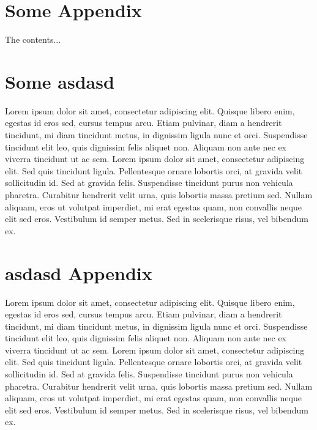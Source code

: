 \appendixpage
\begin{appendices}

\chapter{Some Appendix}
	The contents...

\chapter{Some asdasd}
	Lorem ipsum dolor sit amet, consectetur adipiscing elit. Quisque libero enim, egestas id eros sed, cursus tempus arcu. Etiam pulvinar, diam a hendrerit tincidunt, mi diam tincidunt metus, in dignissim ligula nunc et orci. Suspendisse tincidunt elit leo, quis dignissim felis aliquet non. Aliquam non ante nec ex viverra tincidunt ut ac sem. Lorem ipsum dolor sit amet, consectetur adipiscing elit. Sed quis tincidunt ligula. Pellentesque ornare lobortis orci, at gravida velit sollicitudin id. Sed at gravida felis. Suspendisse tincidunt purus non vehicula pharetra. Curabitur hendrerit velit urna, quis lobortis massa pretium sed. Nullam aliquam, eros ut volutpat imperdiet, mi erat egestas quam, non convallis neque elit sed eros. Vestibulum id semper metus. Sed in scelerisque risus, vel bibendum ex.	

\chapter{asdasd Appendix}
	Lorem ipsum dolor sit amet, consectetur adipiscing elit. Quisque libero enim, egestas id eros sed, cursus tempus arcu. Etiam pulvinar, diam a hendrerit tincidunt, mi diam tincidunt metus, in dignissim ligula nunc et orci. Suspendisse tincidunt elit leo, quis dignissim felis aliquet non. Aliquam non ante nec ex viverra tincidunt ut ac sem. Lorem ipsum dolor sit amet, consectetur adipiscing elit. Sed quis tincidunt ligula. Pellentesque ornare lobortis orci, at gravida velit sollicitudin id. Sed at gravida felis. Suspendisse tincidunt purus non vehicula pharetra. Curabitur hendrerit velit urna, quis lobortis massa pretium sed. Nullam aliquam, eros ut volutpat imperdiet, mi erat egestas quam, non convallis neque elit sed eros. Vestibulum id semper metus. Sed in scelerisque risus, vel bibendum ex.	
	
\end{appendices}